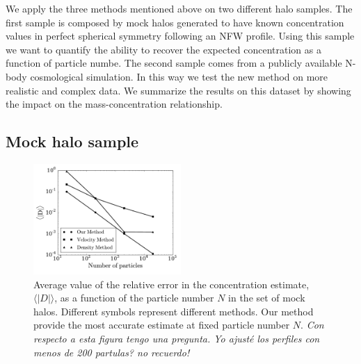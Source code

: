 \documentclass[a4,useAMS,usenatbib,usegraphicx]{mn2e}
\newcommand{\avg}[1]{\langle{#1}\rangle}
\begin{document}
We apply the three methods mentioned above on two different halo
samples.
The first sample is composed by mock halos generated to have known
concentration values in perfect spherical symmetry following an NFW
profile.    
Using this sample we want to quantify the ability to recover the
expected concentration as a function of particle numbe.
The second sample comes from a publicly available N-body cosmological
simulation.  
In this way we test the new method on more realistic and complex
data. 
We summarize the results on this dataset by showing the impact on the
mass-concentration relationship.



\subsection{Mock halo sample}

\begin{figure}
\begin{center}
  \includegraphics[width=0.50\textwidth]{error.pdf}
\end{center}
\caption{Average value of the relative error in the concentration
  estimate, $\avg{|D|}$, as a function of the particle number $N$ in
  the set of mock halos. Different symbols represent different
  methods. Our method provide the most accurate estimate at fixed
  particle number $N$.  {\it Con respecto a esta figura tengo una
    pregunta. Yo ajusté los perfiles con menos de 200 partulas? no
    recuerdo!}
    \label{fig:error}}
\end{figure}
\end{document}
